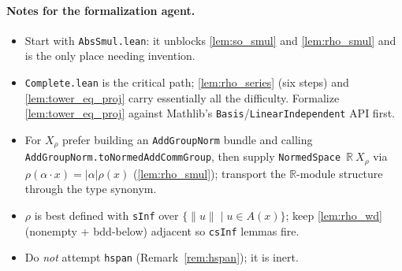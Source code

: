 \documentclass[11pt]{article}
\theoremstyle{definition}
\theoremstyle{plain}
\theoremstyle{remark}
\newcommand{\R}{\mathbb{R}}
\newcommand{\norm}[1]{\lVert #1\rVert}
\newcommand{\abs}[1]{\lvert #1\rvert}
\newcommand{\act}{\cdot}
\newcommand{\Xrho}{X_{\rho}}
\begin{document}
\paragraph{Notes for the formalization agent.}
\begin{itemize}[leftmargin=1.5em]
\item Start with \texttt{AbsSmul.lean}: it unblocks \ref{lem:so_smul} and
      \ref{lem:rho_smul} and is the only place needing invention.
\item \texttt{Complete.lean} is the critical path; \ref{lem:rho_series} (six steps)
      and \ref{lem:tower_eq_proj} carry essentially all the difficulty. Formalize
      \ref{lem:tower_eq_proj} against Mathlib's \texttt{Basis}/\texttt{LinearIndependent}
      API first.
\item For \(\Xrho\) prefer building an \texttt{AddGroupNorm} bundle and calling
      \texttt{AddGroupNorm.toNormedAddCommGroup}, then supply
      \texttt{NormedSpace}\ \(\R\ \Xrho\) via \(\rho(\alpha\act x)=\abs{\alpha}\rho(x)\)
      (\ref{lem:rho_smul}); transport the \(\R\)-module structure through the type synonym.
\item \(\rho\) is best defined with \texttt{sInf} over \(\{\norm{u}\mid u\in A(x)\}\);
      keep \ref{lem:rho_wd} (nonempty + bdd-below) adjacent so \texttt{csInf} lemmas fire.
\item Do \emph{not} attempt \texttt{hspan} (Remark~\ref{rem:hspan}); it is inert.
\end{itemize}
\end{document}
